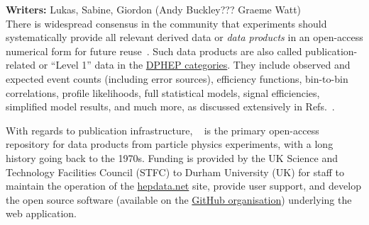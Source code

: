 \documentclass[11pt]{article}
\begin{document}
\noindent\textbf{Writers:} Lukas, Sabine, Giordon (Andy Buckley??? Graeme Watt) \\

There is widespread consensus in the community that experiments should systematically provide all relevant derived data or \emph{data products} in an open-access numerical form for future reuse~\cite{LHCReinterpretationForum:2020xtr}. 
Such data products are also called publication-related or ``Level 1'' data in the 
\href{https://opendata.cern.ch/docs/about}{DPHEP categories}. 
They include observed and expected event counts  (including error sources), efficiency functions,  bin-to-bin correlations, profile likelihoods, full statistical models, signal efficiencies, simplified model results, and much more, 
as discussed extensively in Refs.~\cite{LHCReinterpretationForum:2020xtr,Cranmer:2021urp}.

With regards to publication infrastructure, 
\hepdata~\cite{hepdata} is the primary open-access repository for %
data products from particle physics experiments, with a long history going back to the 1970s.
Funding is provided by the UK Science and Technology Facilities Council (STFC) to Durham University (UK) for staff to maintain the operation of the \href{https://www.hepdata.net/}{hepdata.net} site, provide user support, and develop the open source software (available on the \href{https://github.com/HEPData}{\hepdata GitHub organisation}) underlying the web application.
\end{document}
